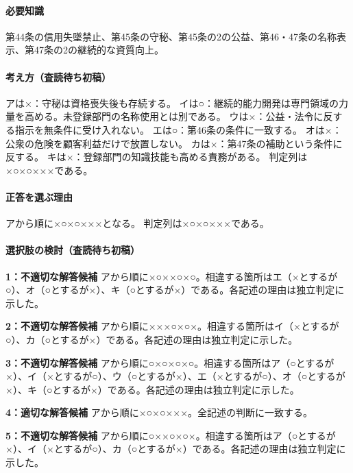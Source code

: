 \paragraph{必要知識} 第44条の信用失墜禁止、第45条の守秘、第45条の2の公益、第46・47条の名称表示、第47条の2の継続的な資質向上。

\paragraph{考え方（査読待ち初稿）} アは×：守秘は資格喪失後も存続する。 イは○：継続的能力開発は専門領域の力量を高める。未登録部門の名称使用とは別である。 ウは×：公益・法令に反する指示を無条件に受け入れない。 エは○：第46条の条件に一致する。 オは×：公衆の危険を顧客利益だけで放置しない。 カは×：第47条の補助という条件に反する。 キは×：登録部門の知識技能も高める責務がある。 判定列は×○×○×××である。

\paragraph{正答を選ぶ理由} アから順に×○×○×××となる。  判定列は×○×○×××である。

\paragraph{選択肢の検討（査読待ち初稿）}\mbox{}\par

\noindent\textbf{1：不適切な解答候補} アから順に×○××○×○。相違する箇所はエ（×とするが○）、オ（○とするが×）、キ（○とするが×）である。各記述の理由は独立判定に示した。\par

\noindent\textbf{2：不適切な解答候補} アから順に×××○×○×。相違する箇所はイ（×とするが○）、カ（○とするが×）である。各記述の理由は独立判定に示した。\par

\noindent\textbf{3：不適切な解答候補} アから順に○×○×○×○。相違する箇所はア（○とするが×）、イ（×とするが○）、ウ（○とするが×）、エ（×とするが○）、オ（○とするが×）、キ（○とするが×）である。各記述の理由は独立判定に示した。\par

\noindent\textbf{4：適切な解答候補} アから順に×○×○×××。全記述の判断に一致する。\par

\noindent\textbf{5：不適切な解答候補} アから順に○××○×○×。相違する箇所はア（○とするが×）、イ（×とするが○）、カ（○とするが×）である。各記述の理由は独立判定に示した。\par

